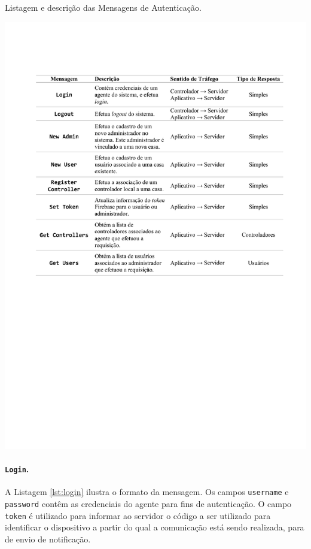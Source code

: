 \begin{table}[h]
	\centering
	\caption{Listagem e descrição das Mensagens de Autenticação.}\smallskip
	\label{tab:mensagens_auth}
	\includegraphics[width=\textwidth]{tabelas/mensagens_auth.pdf}
\end{table}

\paragraph*{\texttt{Login}.} A Listagem \ref{lst:login} ilustra o formato da mensagem. Os campos \texttt{username} e \texttt{password} contêm as credenciais do agente para fins de autenticação. O campo \texttt{token} é utilizado para informar ao servidor o código a ser utilizado para identificar o dispositivo a partir do qual a comunicação está sendo realizada, para de envio de notificação.

